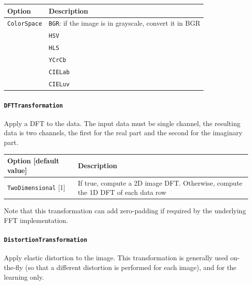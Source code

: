 \documentclass[a4paper,11pt,oneside]{article}
\newcommand{\iponly}{\reversemarginpar
    \marginnote{\color{listletiblue}\normalfont\scriptsize
    {\ttfamily{}\hyperref[sec:N2D2-IP]{\color{listletiblue}N2D2 IP}} \emph{only}}}
\begin{document}
\begin{center}
 \begin{tabular}{| p{5cm} | p{10cm} | }
 \hline
 Option & Description\\
 \hline\hline
  \cellcolor{requiredcolor}\lstinline!ColorSpace! & \lstinline!BGR!: if the
  image is in grayscale, convert it in BGR \\
 & \lstinline!HSV! \\
 & \lstinline!HLS! \\
 & \lstinline!YCrCb! \\
 & \lstinline!CIELab! \\
 & \lstinline!CIELuv! \\
 \hline
\end{tabular}
\end{center}


\paragraph{\texorpdfstring{%
\lstinline[basicstyle=\ttfamily\bfseries]!DFTTransformation!}
{DFTTransformation}}
Apply a DFT to the data.
The input data must be single channel, the resulting data is two channels,
the first for the real part and the second for the imaginary part.

\begin{center}
 \begin{tabular}{| p{5cm} | p{10cm} | }
 \hline
 Option [default value] & Description\\
 \hline\hline
  \lstinline!TwoDimensional! [1] & If true, compute a 2D image DFT. Otherwise,
   compute the 1D DFT of each data row \\
 \hline
\end{tabular}
\end{center}

Note that this transformation can add zero-padding if required by the underlying
 FFT implementation.


\paragraph{\label{par:DistortionTransformation}%
\texorpdfstring{\lstinline[basicstyle=\ttfamily\bfseries]!DistortionTransformation!\protect\iponly}
{DistortionTransformation}}
Apply elastic distortion to the image. This transformation is generally used
on-the-fly (so that a different distortion is performed for each image), and
for the learning only.
\end{document}
